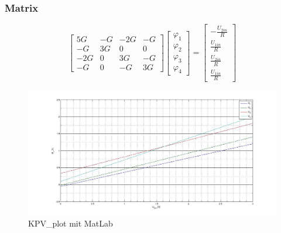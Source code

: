 \documentclass[10pt]{report}
\begin{document}
        \vspace{0.5cm}

        \subsubsection{Matrix}
        \begin{equation*}
            \begin{bmatrix}
                5G & -G & -2G & -G\\
                -G & 3G & 0 & 0\\
                -2G & 0 & 3G & -G\\
                -G & 0 & -G & 3G
            \end{bmatrix}
            \begin{bmatrix}
                \varphi_1 \\
                \varphi_2 \\
                \varphi_3 \\
                \varphi_4
            \end{bmatrix}
            =
            \begin{bmatrix}
                -\frac{U_{2in}}{R}\\
                \frac{U_{1in}}{R}\\
                \frac{U_{2in}}{R}\\
                \frac{U_{1in}}{R}
            \end{bmatrix}
        \end{equation*}

        \begin{center}
            \begin{figure}[H]
                \includegraphics[width=\textwidth]{KPV.jpg}
              \caption{KPV\_plot mit MatLab}
            \end{figure}
        \end{center}
\end{document}

